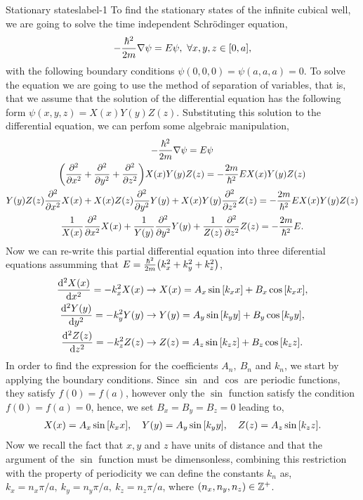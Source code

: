 \documentclass[../main.tex]{subfiles}
\begin{document}
\begin{sol}{Stationary states}{label-1}
    To find the stationary states of the infinite cubical well, we are going to solve the time independent Schrödinger equation,
    \begin{gather*}
        -\frac{\hbar^2}{2m}\nabla\psi=E\psi,~\forall x,y,z \in \qty[0,a],
    \end{gather*}
    with the following boundary conditions $\psi(0,0,0)=\psi(a,a,a)=0$.
    To solve the equation we are going to use the method of separation of variables, that is, that we assume that the solution of the differential equation has the following form $\psi(x,y,z)=X(x)Y(y)Z(z)$.
    Substituting this solution to the differential equation, we can perfom some algebraic manipulation,
    \begin{gather*}
        -\frac{\hbar^2}{2m}\nabla\psi =E\psi \\
        \qty(\pdv[2]{x}+\pdv[2]{y}+\pdv[2]{z})X(x)Y(y)Z(z) = -\frac{2m}{\hbar^2}EX(x)Y(y)Z(z) \\
        Y(y)Z(z)\pdv[2]{x}X(x)+X(x)Z(z)\pdv[2]{y}Y(y)+X(x)Y(y)\pdv[2]{z}Z(z) = -\frac{2m}{\hbar^2}EX(x)Y(y)Z(z) \\
        \frac{1}{X(x)}\pdv[2]{x}X(x)+\frac{1}{Y(y)}\pdv[2]{y}Y(y)+\frac{1}{Z(z)}\pdv[2]{z}Z(z)= -\frac{2m}{\hbar^2}E.
    \end{gather*}
    Now we can re-write this partial differential equation into three diferential equations assumming that $E=\frac{\hbar^2}{2m}\qty(k_x^2+k_y^2+k_z^2)$,
    \begin{align*}
        \dv[2]{X(x)}{x} = -k_x^2X(x) &\rightarrow X(x)=A_x\sin\qty[k_x x]+B_x\cos\qty[k_x x],\\
        \dv[2]{Y(y)}{y} = -k_y^2Y(y) &\rightarrow Y(y)=A_y\sin\qty[k_y y]+B_y\cos\qty[k_y y],\\
        \dv[2]{Z(z)}{z} = -k_z^2Z(z) &\rightarrow Z(z)=A_z\sin\qty[k_z z]+B_z\cos\qty[k_z z].
    \end{align*}
    In order to find the expression for the coefficients $A_n,~B_n$ and $k_n$, we start by applying the boundary conditions.
    Since $\sin$ and $\cos$ are periodic functions, they satisfy $f(0)=f(a)$, however only the $\sin$ function satisfy the condition $f(0)=f(a)=0$, hence, we set $B_x=B_y=B_z=0$ leading to,
     \begin{gather*}
        X(x)=A_x\sin\qty[k_x x],\quad Y(y)=A_y\sin\qty[k_y y],\quad Z(z)=A_z\sin\qty[k_z z].
    \end{gather*}
    Now we recall the fact that $x,y$ and $z$ have units of distance and that the argument of the $\sin$ function must be dimensonless, combining this restriction with the property of periodicity we can define the constants $k_n$ as, $k_x=n_x\pi/a,~k_y=n_y\pi/a,~k_z=n_z\pi/a$, where $\qty(n_x,n_y,n_z)\in\mathbb{Z}^+$.

\end{sol}
\end{document}
